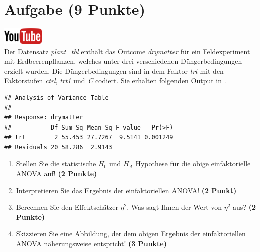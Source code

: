 \documentclass[a4paper, 9pt]{scrartcl}\usepackage[]{graphicx}\usepackage[]{xcolor}
\makeatletter
\newenvironment{kframe}{%
 \def\at@end@of@kframe{}%
 \ifinner\ifhmode%
  \def\at@end@of@kframe{\end{minipage}}%
  \begin{minipage}{\columnwidth}%
 \fi\fi%
 \def\FrameCommand##1{\hskip\@totalleftmargin \hskip-\fboxsep
 \colorbox{shadecolor}{##1}\hskip-\fboxsep
     \hskip-\linewidth \hskip-\@totalleftmargin \hskip\columnwidth}%
 \MakeFramed {\advance\hsize-\width
   \@totalleftmargin\z@ \linewidth\hsize
   \@setminipage}}%
 {\par\unskip\endMakeFramed%
 \at@end@of@kframe}
\newenvironment{knitrout}{}{} %
\makeatother
\begin{document}
 
\clearpage

\section{Aufgabe \hfill (9 Punkte)}

\hfill\href{https://youtu.be/d4CFR2MKX7I}{\includegraphics[width =
  2cm]{img/youtube}}\\[1Ex]




Der Datensatz \textit{plant\_tbl} enth{\"a}lt das Outcome \textit{drymatter} f{\"u}r ein Feldexperiment mit 
Erdbeerenpflanzen, welches unter drei 
verschiedenen D{\"u}ngerbedingungen erzielt wurden. Die D{\"u}ngerbedingungen sind in dem Faktor
\textit{trt} mit den Faktorstufen \textit{ctrl},  \textit{trt1} und
 \textit{C} codiert. Sie erhalten folgenden Output in \Rlogo.

\begin{knitrout}
\color{fgcolor}\begin{kframe}
\begin{verbatim}
## Analysis of Variance Table
## 
## Response: drymatter
##           Df Sum Sq Mean Sq F value   Pr(>F)
## trt        2 55.453 27.7267  9.5141 0.001249
## Residuals 20 58.286  2.9143
\end{verbatim}
\end{kframe}
\end{knitrout}

\begin{enumerate}
\item Stellen Sie die statistische $H_0$ und $H_A$ Hypothese f{\"u}r die obige
  einfaktorielle ANOVA auf! \textbf{(2 Punkte)}
\item Interpretieren Sie das Ergebnis der einfaktoriellen ANOVA! \textbf{(2 Punkt)} 
\item Berechnen Sie den Effektsch{\"a}tzer $\eta^2$. Was sagt Ihnen der Wert von
  $\eta^2$ aus? \textbf{(2 Punkte)}
\item Skizzieren Sie eine Abbildung, der dem obigen Ergebnis der
  einfaktoriellen ANOVA n{\"a}herungsweise entspricht! \textbf{(3 Punkte)}
\end{enumerate}
\end{document}
